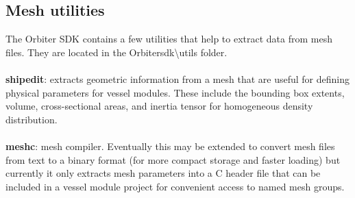 \documentclass[Orbiter Developer Manual.tex]{subfiles}
\begin{document}
\subsection{Mesh utilities}
The Orbiter SDK contains a few utilities that help to extract data from mesh files. They are located in the Orbitersdk\textbackslash utils folder.\\
\\
\textbf{shipedit}: extracts geometric information from a mesh that are useful for defining physical parameters for vessel modules. These include the bounding box extents, volume, cross-sectional areas, and inertia tensor for homogeneous density distribution.\\
\\
\textbf{meshc}: mesh compiler. Eventually this may be extended to convert mesh files from text to a binary format (for more compact storage and faster loading) but currently it only extracts mesh parameters into a C header file that can be included in a vessel module project for convenient access to named mesh groups.
\end{document}
